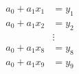 \begin{equation}
  \begin{split}
    a_{0} + a_{1} x_{1} &= y_{1} \\
    a_{0} + a_{1} x_{2} &= y_{2} \\
    &\vdots \\
    a_{0} + a_{1} x_{8} &= y_{8} \\
    a_{0} + a_{1} x_{9} &= y_{9} 
  \end{split}
  \label{eqn:bevington linear system}
\end{equation}
\endinput  %